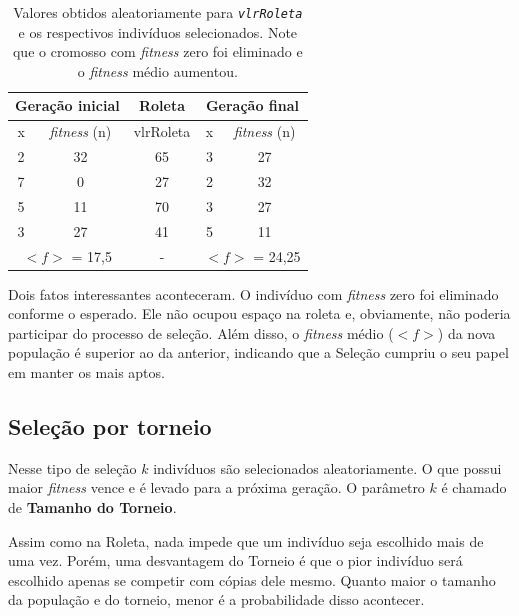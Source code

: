 \begin{table}[htp]
	\caption{\label{tabRoletaManual}Valores obtidos aleatoriamente para \textit{\texttt{vlrRoleta}} e os respectivos indivíduos selecionados. Note que o cromosso com \textit{fitness} zero foi eliminado e o \textit{fitness} médio aumentou.}
	\begin{center}
		\begin{tabular}{c|c|c|c|c}
			\hline
			\multicolumn{2}{c|}{\textbf{Geração inicial}} & \textbf{Roleta}& \multicolumn{2}{c}{\textbf{Geração final}}  \\
			\hline
			x 					& \textit{fitness} (n)	& vlrRoleta						& x						& \textit{fitness} (n)	\\
			\hline
			2 					& 32										& 65 									& 3						&	27   \\
			7 					& 0 										& 27 									& 2						&	32\\
			5 					& 11										& 70 									& 3						&	27\\	
			3 					& 27										& 41 									& 5						&	11\\
			\hline
			\multicolumn{2}{c|}{$<f>$ = 17,5} & - & \multicolumn{2}{c}{$<f>$ = 24,25}  \\
			\hline
		\end{tabular}
	\end{center}
\end{table}
	
	Dois fatos interessantes aconteceram. O indivíduo com \textit{fitness} zero foi eliminado conforme o esperado. Ele não ocupou espaço na roleta e, obviamente, não poderia participar do processo de seleção. Além disso, o \textit{fitness} médio ($<f>$) da nova população é superior ao da anterior, indicando que a Seleção cumpriu o seu papel em manter os mais aptos.
	
	\subsection{Seleção por torneio}
	
	Nesse tipo de seleção $k$ indivíduos são selecionados aleatoriamente. O que possui maior \emph{fitness} vence e é levado para a próxima geração. O parâmetro $k$ é chamado de \textbf{Tamanho do Torneio}.
	
	Assim como na Roleta, nada impede que um indivíduo seja escolhido mais de uma vez. Porém, uma desvantagem do Torneio é que o pior indivíduo será escolhido apenas se competir com cópias dele mesmo. Quanto maior o tamanho da população e do torneio, menor é a probabilidade disso acontecer.
	
